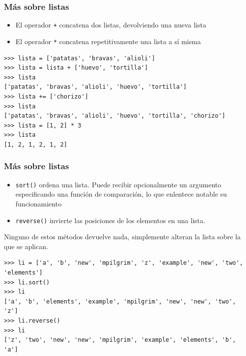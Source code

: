 \begin{frame}[fragile]
\frametitle{Más sobre listas}

\begin{itemize}
\item El operador \verb|+| concatena dos listas, devolviendo una nueva
  lista
\item El operador \verb|*| concatena repetitivamente una lista a sí
  misma
\end{itemize}

\begin{footnotesize}
\begin{verbatim}
>>> lista = ['patatas', 'bravas', 'alioli']
>>> lista = lista + ['huevo', 'tortilla'] 
>>> lista
['patatas', 'bravas', 'alioli', 'huevo', 'tortilla']
>>> lista += ['chorizo']                
>>> lista
['patatas', 'bravas', 'alioli', 'huevo', 'tortilla', 'chorizo']
>>> lista = [1, 2] * 3              
>>> lista
[1, 2, 1, 2, 1, 2]
\end{verbatim}
\end{footnotesize}



\end{frame}



\begin{frame}[fragile]
\frametitle{Más sobre listas}

\begin{itemize}
\item \verb|sort()| ordena una lista. Puede recibir opcionalmente un
  argumento especificando una función de comparación, lo que enlentece
  notable su funcionamiento
\item \verb|reverse()| invierte las posiciones de los elementos en una
  lista.
\end{itemize}
Ninguno de estos métodos devuelve nada, simplemente alteran la lista
sobre la que se aplican.
\begin{footnotesize}
\begin{verbatim}
>>> li = ['a', 'b', 'new', 'mpilgrim', 'z', 'example', 'new', 'two', 'elements']
>>> li.sort() 
>>> li
['a', 'b', 'elements', 'example', 'mpilgrim', 'new', 'new', 'two', 'z']
>>> li.reverse()
>>> li
['z', 'two', 'new', 'new', 'mpilgrim', 'example', 'elements', 'b', 'a']
\end{verbatim}
\end{footnotesize}

\end{frame}










